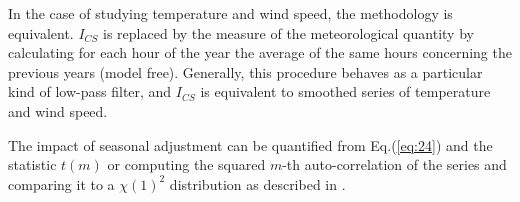 \documentclass[preprint,12pt,3p]{elsarticle}
\begin{document}
 In the case of studying temperature and wind speed, the methodology is equivalent. $I_{CS}$ is replaced by the measure of the meteorological quantity by calculating for each hour of the year the average of the same hours concerning the previous years (model free). Generally, this procedure behaves as a particular kind of low-pass filter, and $I_{CS}$ is equivalent to smoothed series of temperature and wind speed.



The impact of seasonal adjustment can be quantified from Eq.(\ref{eq:24}) and the statistic $t(m)$ \citep{article7} or computing the squared $m$-th auto-correlation of the series and comparing it to a $\chi(1) ^2$ distribution as described in \cite{article8}.
\end{document}
